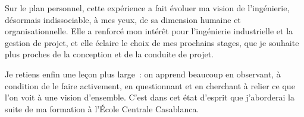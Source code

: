 \documentclass[12pt,a4paper,oneside]{report}
\begin{document}
Sur le plan personnel, cette expérience a fait évoluer ma vision de l'ingénierie, désormais indissociable, à mes yeux, de sa dimension humaine et organisationnelle. Elle a renforcé mon intérêt pour l'ingénierie industrielle et la gestion de projet, et elle éclaire le choix de mes prochains stages, que je souhaite plus proches de la conception et de la conduite de projet.

Je retiens enfin une leçon plus large~: on apprend beaucoup en observant, à condition de le faire activement, en questionnant et en cherchant à relier ce que l'on voit à une vision d'ensemble. C'est dans cet état d'esprit que j'aborderai la suite de ma formation à l'École Centrale Casablanca.

\printbibliography[heading=bibintoc,title={Sources et références}]
\end{document}
